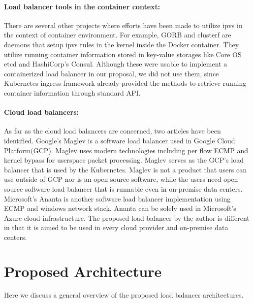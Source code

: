\paragraph{\bf Load balancer tools in the container context:}
There are several other projects where efforts have been made to utilize ipvs in the context of container environment.
For example, GORB\cite{Sibiryov2015} and clusterf\cite{Aaltodoc:http://urn.fi/URN:NBN:fi:aalto-201611025433} are daemons 
that setup ipvs rules in the kernel inside the Docker container. 
They utilize running container information stored in key-value storages
like Core OS etcd\cite{CoreOSEtcd} and HashiCorp's Consul\cite{HashiCorpConsul}. 
Although these were usable to implement a containerized load balancer in our proposal, we did not use them, 
since Kubernetes ingress framework already provided the methods to retrieve running container information through standard API.

\paragraph{\bf Cloud load balancers:}

As far as the cloud load balancers are concerned, two articles have been identified.
Google's Maglev\cite{eisenbud2016maglev} is a software load balancer used in Google Cloud Platform(GCP)\cite{Voellm2013}.
Maglev uses modern technologies including per flow ECMP and kernel bypass for userspace packet processing.
Maglev serves as the GCP's load balancer that is used by the Kubernetes.
Maglev is not a product that users can use outside of GCP nor is an open source software, while the users need open source software load balancer that is runnable even in on-premise data centers.
Microsoft's Ananta\cite{patel2013ananta} is another software load balancer implementation using ECMP and windows network stack.
Ananta can be solely used in Microsoft's Azure cloud infrastructure\cite{patel2013ananta}.
The proposed load balancer by the author is different in that it is aimed to be used in every cloud provider and on-premise data centers.

\section{Proposed Architecture}\label{Proposed Architecture}

Here we discuss a general overview of the proposed load balancer architectures.


